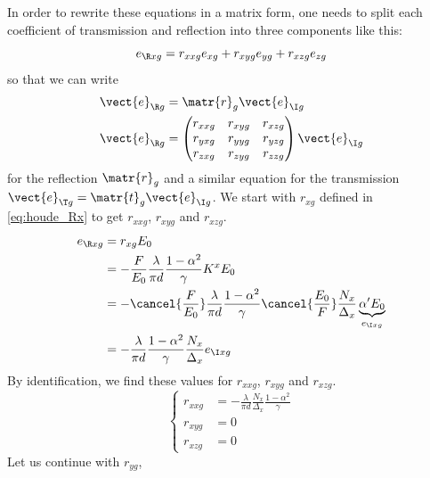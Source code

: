 \begin{refsection}
In order to rewrite these equations in a matrix form, one needs to split each coefficient of transmission and reflection into three components like this:
\begin{equation}
    e_{\R xg} = r_{xxg} e_{xg} + r_{xyg} e_{yg} + r_{xzg} e_{zg}
\end{equation}
so that we can write
\begin{align}
    \vect{e}_{\R g} &= \matr{r}_g \vect{e}_{\I g}
    \\
    \vect{e}_{\R g} &=
    \begin{pmatrix}
        r_{xxg} & r_{xyg} & r_{xzg} \\
        r_{yxg} & r_{yyg} & r_{yzg} \\
        r_{zxg} & r_{zyg} & r_{zzg}
    \end{pmatrix}
    \vect{e}_{\I g}
\end{align}
for the reflection $\matr{r}_g$ and a similar equation
for the transmission $\vect{e}_{\T g} = \matr{t}_g \vect{e}_{\I g}$.
We start with $r_{xg}$ defined in \cref{eq:houde_Rx} to get $r_{xxg}$, $r_{xyg}$ and $r_{xzg}$.
\begin{align*}
    e_{\R xg} &= r_{xg} E_0
    \\
           &= -\frac{F}{E_0}
              \frac{\lambda}{\pi d}
              \frac{1-\alpha^2}{\gamma}
              K^x
              E_0
    \\
           &= -\cancel{\frac{F}{E_0}}
              \frac{\lambda}{\pi d}
              \frac{1-\alpha^2}{\gamma}
              \cancel{\frac{E_0}{F}}
              \frac{N_x}{\Delta_x}
              \underbrace{
                  \alpha'
                  E_0
              }_{e_{\I xg}}
    \\
           &= -\frac{\lambda}{\pi d}
              \frac{1-\alpha^2}{\gamma}
              \frac{N_x}{\Delta_x}
              e_{\I xg}
\end{align*}
By identification, we find these values for $r_{xxg}$, $r_{xyg}$ and $r_{xzg}$.
\begin{equation}
    \left\lbrace
    \begin{aligned}
        r_{xxg} &= -\frac{\lambda}{\pi d}
                  \frac{N_x}{\Delta_x}
                  \frac{1-\alpha^2}{\gamma}
        \\
        r_{xyg} &= 0
        \\
        r_{xzg} &= 0
    \end{aligned}
    \right.
\end{equation}
Let us continue with $r_{yg}$,

\end{refsection}
